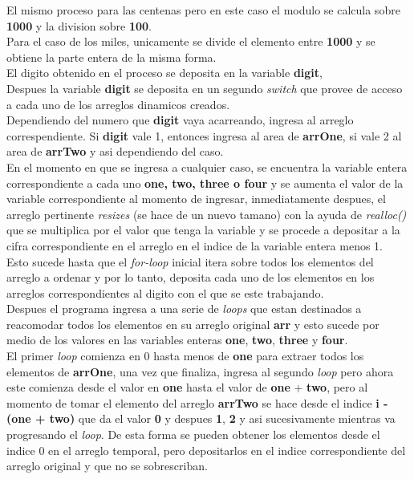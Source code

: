 \documentclass{article}
\begin{document}
				El mismo proceso para las centenas pero en este caso el modulo se calcula sobre \textbf{1000} y la division sobre \textbf{100}.\\
				
				Para el caso de los miles, unicamente se divide el elemento entre \textbf{1000} y se obtiene la parte entera de la misma forma.\\
				
				El digito obtenido en el proceso se deposita en la variable \textbf{digit},\\
				
				Despues la variable \textbf{digit} se deposita en un segundo \emph{switch} que provee de acceso a cada uno de los arreglos dinamicos creados.\\
				
				Dependiendo del numero que \textbf{digit} vaya acarreando, ingresa al arreglo correspendiente. Si \textbf{digit} vale 1, entonces ingresa al area de \textbf{arrOne}, si vale 2 al area de \textbf{arrTwo} y asi dependiendo del caso.\\
				
				En el momento en que se ingresa a cualquier caso, se encuentra la variable entera correspondiente a cada uno \textbf{one, two, three o four} y se aumenta el valor de la variable correspondiente al momento de ingresar, inmediatamente despues, el arreglo pertinente \emph{resizes} (se hace de un nuevo tamano) con la ayuda de \emph{realloc()} que se multiplica por el valor que tenga la variable y se procede a depositar a la cifra correspondiente en el arreglo en el indice de la variable entera menos 1.\\
				
				Esto sucede hasta que el \emph{for-loop} inicial itera sobre todos los elementos del arreglo a ordenar y por lo tanto, deposita cada uno de los elementos en los arreglos correspondientes al digito con el que se este trabajando.\\
				
				Despues el programa ingresa a una serie de \emph{loops} que estan destinados a reacomodar todos los elementos en su arreglo original \textbf{arr} y esto sucede por medio de los valores en las variables enteras \textbf{one}, \textbf{two}, \textbf{three} y \textbf{four}.\\
				
				El primer \emph{loop} comienza en 0 hasta menos de \textbf{one} para extraer todos los elementos de \textbf{arrOne}, una vez que finaliza, ingresa al segundo \emph{loop} pero ahora este comienza desde el valor en \textbf{one} hasta el valor de \textbf{one} + \textbf{two}, pero al momento de tomar el elemento del arreglo \textbf{arrTwo} se hace desde el indice \textbf{i - (one + two)} que da el valor \textbf{0} y despues \textbf{1}, \textbf{2} y asi sucesivamente mientras va progresando el \emph{loop}. De esta forma se pueden obtener los elementos desde el indice 0 en el arreglo temporal, pero depositarlos en el indice correspondiente del arreglo original y que no se sobrescriban.\\
				
\end{document}
